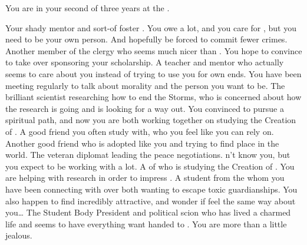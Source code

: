 \documentclass[char]{GL2020}
\begin{document}
\begin{itemz}[Notes]
    \item You are in your second of three years at the \pSchool{}.
\end{itemz}

\begin{contacts}
    \contact{\cAntiChup{}} Your shady mentor and sort-of foster \cAntiChup{\parent}. You owe \cAntiChup{\them} a lot, and you care for \cAntiChup{\them}, but you need to be your own person. And hopefully be forced to commit fewer crimes.
    \contact{\cBeetle{}} Another member of the \pTech{} clergy who seems much nicer than \cAntiChup{}. You hope to convince \cBeetle{\them} to take over sponsoring your scholarship.
    \contact{\cEthics{}} A teacher and mentor who actually seems to care about you instead of trying to use you for \cEthics{\their} own ends. You have been meeting regularly to talk about morality and the person you want to be.
    \contact{\cHeadScientist{}} The brilliant scientist researching how to end the Storms, who is concerned about how the research is going and is looking for a way out. You convinced \cHeadScientist{\them} to pursue a spiritual path, and now you are both working together on studying the Creation of \pEarth{}.
    \contact{\cTechStar{}} A good friend you often study with, who you feel like you can rely on.
    \contact{\cAmbition{}} Another good friend who is adopted like you and trying to find \cAmbition{\their} place in the world.
    \contact{\cDiplomat{}} The veteran \pTech{} diplomat leading the peace negotiations. \cDiplomat{\Theydo}n't know you, but you expect to be working with \cDiplomat{\them} a lot.
    \contact{\cEbbPriest{}} A \pShippie{} \cEbbPriest{\cleric} of \cEbb{} who is studying the Creation of \pEarth{}. You are helping with \cEbbPriest{\their} research in order to impress \cBeetle{}.
    \contact{\cAdopted{}} A student from the \pFarm{} whom you have been connecting with over both wanting to escape toxic guardianships. You also happen to find \cAdopted{\them} incredibly attractive, and wonder if \cAdopted{\they} feel\cAdopted{\verbs} the same way about you…
    \contact{\cPresident{\full}} The Student Body President and political scion who has lived a charmed life and seems to have everything \cPresident{\they} want handed to \cPresident{\them}. You are more than a little jealous.
\end{contacts}
\end{document}
